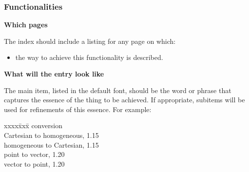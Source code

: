 \documentclass{article}
\newenvironment{indexex}{\begin{tabbing}
xxxx\=xxx\=\kill}{\end{tabbing}}
\begin{document}
\subsubsection{Functionalities}%
\label{functionalities}

\begin{description}
   \item{\bf Which pages} 

         The index should include a listing for any page on which:
           \begin{itemize}
               \item the way to achieve this functionality is described.
           \end{itemize}
   \item{\bf What will the entry look like}

        The main item, listed in the default font, should be the word 
        or phrase that captures the
        essence of the thing to be achieved.  If appropriate, subitems 
        will be used for refinements of this essence. For example:
        \begin{indexex}
        conversion  \\
        \> Cartesian to homogeneous,      1.15 \\
        \> homogeneous to Cartesian,      1.15 \\
        \> point to vector,               1.20 \\
        \> vector to point,               1.20 \\
        \end{indexex}


\end{description}
\end{document}
